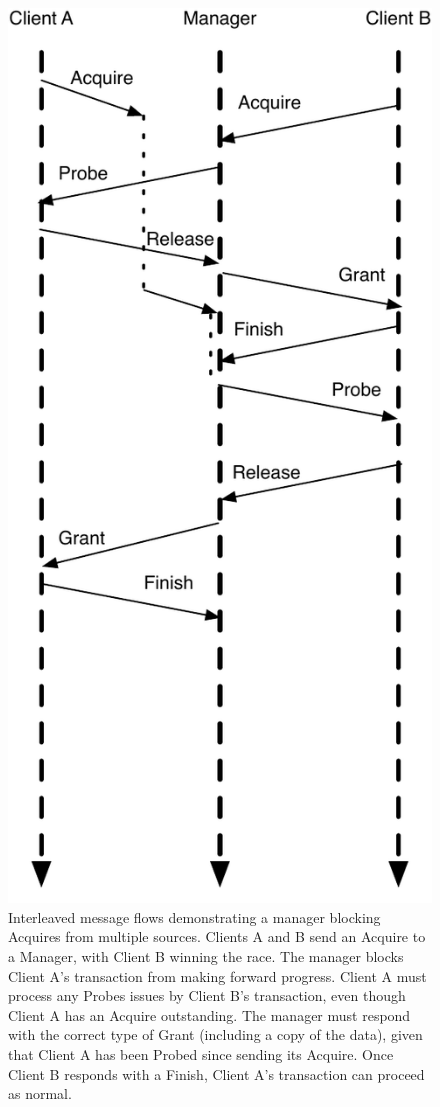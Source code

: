 \begin{figure}[p]
\centering
\includegraphics[width=0.5\columnwidth]{tilelink/figures/ordered.pdf}
\caption[Interleaved message flows  anager blocking Acquires from multiple sources.]{
Interleaved message flows demonstrating a manager blocking Acquires from multiple sources.
Clients A and B send an Acquire to a Manager, with Client B winning the race.
The manager blocks Client A's transaction from making forward progress.
Client A must process any Probes issues by Client B's transaction, even though Client A has an Acquire outstanding.
The manager must respond with the correct type of Grant (including a copy of the data), given that Client A has been Probed since sending its Acquire.
Once Client B responds with a Finish, Client A's transaction can proceed as normal.
}
\label{fig:ordered}
\end{figure}

